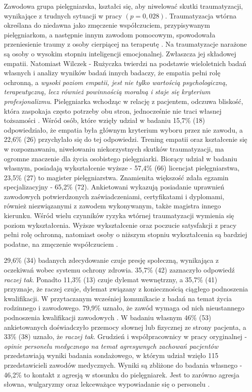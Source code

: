 \documentclass[a4paper,12pt,twoside,openright]{mwrep}
\begin{document}
Zawodowa grupa pielęgniarska, kształci się, aby niwelować skutki traumatyzacji, wynikające z trudnych sytuacji w pracy $(p=0,028)$. Traumatyzacja wtórna określana do niedawna jako zmęczenie współczuciem, przypisywanym pielęgniarkom, a następnie innym zawodom pomocowym, spowodowała przeniesienie traumy z osoby cierpiącej  na terapeutę \cite{figley}. Na traumatyzacje narażone są osoby o wysokim stopniu inteligencji emocjonalnej. Zwłaszcza jej składowej empatii. Natomiast Wilczek - Rużyczka twierdzi na podstawie wieloletnich badań własnych i analizy wyników badań innych badaczy, że empatia pełni rolę ochronną, a  \textit{wysoki poziom empatii, jest nie tylko wartością psychologiczną, terapeutyczną, lecz również powinnością moralną i staje się kryterium profesjonalizmu}.  Pielęgniarka wchodząc w relację z pacjentem, odczuwa bliskość, która zaspokaja często potrzeby obu stron, jednocześnie nie traci własnej tożsamości \cite{wilczek}. Wśród osób, które wzięły udział w badaniu  15,7\% (18) odpowiedziało, że empatia była głównym kryterium wyboru przez nie zawodu, a 22,6\% (26) przychylało się do tej odpowiedzi. Trening empatii oraz kształcenie się w  rozpoznawaniu, niwelowaniu niekorzystnych skutków traumatyzacji,  ma ogromne znaczenie dla życia osobistego pielęgniarki. Biorący udział w badaniu własnym,  posiadają wykształcenie wyższe - 57,4\% (66) licencjat pielęgniarstwa,  23,5\% (27) to magister pielęgniarstwa. Znamienita większość zdała egzamin specjalizacyjny - 65,2\% (72). Ankietowani wykazują posiadanie uprawnień zawodowych potwierdzonych zaświadczeniami, certyfikatami i dyplomami, również niezwiązanymi z zawodem wykonywanym, także magistra innego kierunku. Wśród wielu czynników ryzyka wtórnej traumatyzacji wymienia się poziom wykształcenia. Wyższe wykształcenie oraz poczucie satysfakcji z pracy pełni rolę ochronną, natomiast osoby o niższym stopniu wykształcenia są bardziej podatne, na zmęczenie współczuciem \cite{oginska}.



29,6\% (34) badanych zdecydowanie czuje presję społeczną, wynikająca z oczekiwań wobec systemu ochrony zdrowia. 35,7\% (42) zaznaczyło odpowiedź \textit{raczej tak}. Ponadto 11,3\% (13)  czuje dylemat wewnętrzny, a 35,7\%  (41) przyznaje, że raczej czuje, dylemat związany z koniecznością ciągłego podnoszenia kwalifikacji. W przytaczanym wcześniej komunikacie z badań na temat życia rodzinnego i zawodowego. 79,9\% uznało, że zawód wymaga od nich nieustannego podnoszenia kwalifikacji zawodowych \cite{komunikat}. W badaniu własnym 46\% (53) ankietowanych doświadczyło przemocy słownej lub fizycznej ze strony pacjenta, a 33\% (38) uznało, że  \textit{raczej tak}.  Grudzień i współpracownicy w pracy oryginalnej - \textit{opinie personelu medycznego na temat agresywnych zachowań pacjentów} przedstawiają wyniki badania sondażowego, w którym udział wzięło 115 przedstawicieli zawodów medycznych. Wyniki są zbliżone do badania własnego - 46,2\% to kontakt z agresją w stosunku do pielęgniarek. Jest to zarówno agresja słowna, wulgaryzmy oraz lekceważące wypowiadanie się o personelu \cite{grudzien}. 
\end{document}
